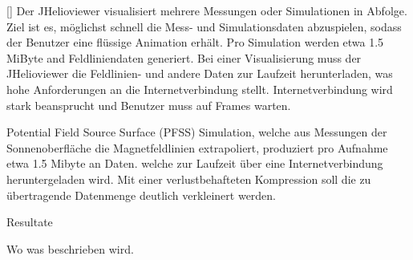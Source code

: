 [\baselineskip]
Der JHelioviewer visualisiert mehrere Messungen oder Simulationen in Abfolge. Ziel ist es, möglichst schnell die Mess- und Simulationsdaten abzuspielen, sodass der Benutzer eine flüssige Animation erhält. Pro Simulation werden etwa 1.5 MiByte and Feldliniendaten generiert. Bei einer Visualisierung muss der JHelioviewer die Feldlinien- und andere Daten zur Laufzeit herunterladen, was hohe Anforderungen an die  Internetverbindung stellt.
Internetverbindung wird stark beansprucht und Benutzer muss auf Frames warten.

Potential Field Source Surface (PFSS) Simulation, welche aus Messungen der Sonnenoberfläche die Magnetfeldlinien extrapoliert, produziert pro Aufnahme etwa 1.5 Mibyte an Daten. welche zur Laufzeit über eine Internetverbindung heruntergeladen wird. Mit einer verlustbehafteten Kompression soll die zu übertragende Datenmenge deutlich verkleinert werden.

Resultate

Wo was beschrieben wird.